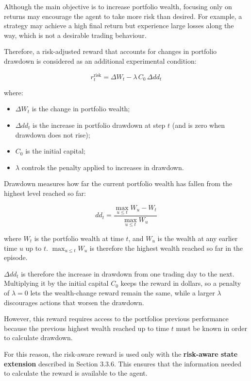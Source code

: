Although the main objective is to increase portfolio wealth, focusing
only on returns may encourage the agent to take more risk than desired.
For example, a strategy may achieve a high final return but experience
large losses along the way, which is not a desirable trading behaviour.

Therefore, a risk-adjusted reward that accounts for changes in portfolio
drawdown is considered as an additional experimental condition:

\[r_{t}^{\mathrm{risk}} = \Delta W_{t} - \lambda\, C_{0}\, \Delta dd_{t}\]

where:

\begin{itemize}
\item
  \(\Delta W_{t}\) is the change in portfolio wealth;
\item
  \(\Delta dd_{t}\) is the increase in portfolio drawdown at step \(t\)
  (and is zero when drawdown does not rise);
\item
  \(C_{0}\) is the initial capital;
\item
  \(\lambda\) controls the penalty applied to increases in drawdown.
\end{itemize}

Drawdown measures how far the current portfolio wealth has fallen from
the highest level reached so far:

\[dd_{t} = \frac{\max_{u \leq t}W_{u} - W_{t}}{\max_{u \leq t}W_{u}}\]

where \(W_{t}\) is the portfolio wealth at time \(t\), and \(W_{u}\) is the
wealth at any earlier time \(u\) up to \(t\).
\(\max_{u \leq t}W_{u}\) is therefore the highest wealth reached so far
in the episode.

\(\Delta dd_{t}\) is therefore the increase in drawdown from one trading
day to the next. Multiplying it by the initial capital \(C_{0}\) keeps
the reward in dollars, so a penalty of \(\lambda = 0\) lets the
wealth-change reward remain the same, while a larger \(\lambda\)
discourages actions that worsen the drawdown.

However, this reward requires access to the
portfolio\textquotesingle s previous performance because the previous
highest wealth reached up to time \(t\) must be known in order to
calculate drawdown.

For this reason, the risk-aware reward is used only with the
\textbf{risk-aware state extension} described in Section 3.3.6. This
ensures that the information needed to calculate the reward is available
to the agent.

